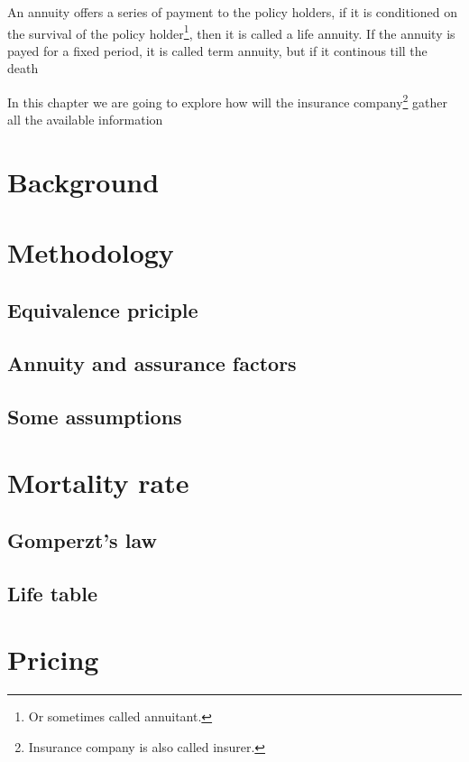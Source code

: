 \documentclass{report}
\begin{document}
An annuity offers a series of payment to the policy holders, if it is conditioned on the survival of the policy holder\footnote{Or sometimes called annuitant.}, then it is called a life annuity. If the annuity is payed for a fixed period, it is called term annuity, but if it continous till the death 




In this chapter we are going to explore how will the insurance company\footnote{Insurance company is also called insurer.} gather all the available information 

\section{Background}

\section{Methodology}

\subsection{Equivalence priciple}
\subsection{Annuity and assurance factors}
\subsection{Some assumptions}

\section{Mortality rate}

\subsection{Gomperzt's law}
\subsection{Life table}

\subsection{}

\section{Pricing}
\end{document}

